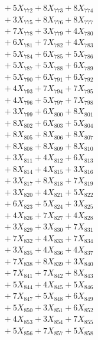 \documentclass[a4paper,10pt]{article}
\begin{document}
{\begin{align}
&\;  + 5 X_{772} + 8 X_{773} + 8 X_{774} \\[0.3ex]
&\;  + 3 X_{775} + 8 X_{776} + 8 X_{777} \\[0.3ex]
&\;  + 7 X_{778} + 3 X_{779} + 4 X_{780} \\[0.3ex]
&\;  + 6 X_{781} + 7 X_{782} + 4 X_{783} \\[0.3ex]
&\;  + 5 X_{784} + 6 X_{785} + 5 X_{786} \\[0.3ex]
&\;  + 5 X_{787} + 5 X_{788} + 6 X_{789} \\[0.5ex]\allowbreak
&\;  + 5 X_{790} + 6 X_{791} + 6 X_{792} \\[0.3ex]
&\;  + 4 X_{793} + 7 X_{794} + 7 X_{795} \\[0.3ex]
&\;  + 4 X_{796} + 5 X_{797} + 7 X_{798} \\[0.3ex]
&\;  + 3 X_{799} + 6 X_{800} + 8 X_{801} \\[0.3ex]
&\;  + 8 X_{802} + 6 X_{803} + 5 X_{804} \\[0.3ex]
&\;  + 8 X_{805} + 8 X_{806} + 8 X_{807} \\[0.3ex]
&\;  + 8 X_{808} + 8 X_{809} + 8 X_{810} \\[0.3ex]
&\;  + 3 X_{811} + 4 X_{812} + 6 X_{813} \\[0.3ex]
&\;  + 8 X_{814} + 4 X_{815} + 3 X_{816} \\[0.3ex]
&\;  + 3 X_{817} + 8 X_{818} + 7 X_{819} \\[0.5ex]\allowbreak
&\;  + 3 X_{820} + 4 X_{821} + 5 X_{822} \\[0.3ex]
&\;  + 6 X_{823} + 5 X_{824} + 3 X_{825} \\[0.3ex]
&\;  + 4 X_{826} + 7 X_{827} + 4 X_{828} \\[0.3ex]
&\;  + 3 X_{829} + 3 X_{830} + 7 X_{831} \\[0.3ex]
&\;  + 7 X_{832} + 4 X_{833} + 7 X_{834} \\[0.3ex]
&\;  + 3 X_{835} + 4 X_{836} + 4 X_{837} \\[0.3ex]
&\;  + 7 X_{838} + 8 X_{839} + 3 X_{840} \\[0.3ex]
&\;  + 7 X_{841} + 7 X_{842} + 8 X_{843} \\[0.3ex]
&\;  + 5 X_{844} + 4 X_{845} + 5 X_{846} \\[0.3ex]
&\;  + 7 X_{847} + 5 X_{848} + 6 X_{849} \\[0.5ex]\allowbreak
&\;  + 5 X_{850} + 3 X_{851} + 6 X_{852} \\[0.3ex]
&\;  + 4 X_{853} + 3 X_{854} + 7 X_{855} \\[0.3ex]
&\;  + 5 X_{856} + 7 X_{857} + 5 X_{858} \\[0.3ex]

\end{align}}
\end{document}
